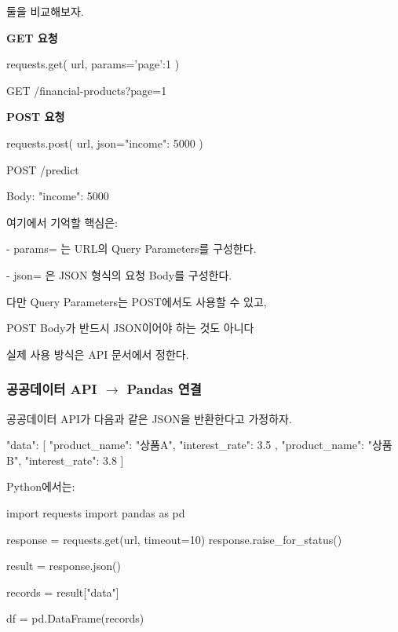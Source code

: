 둘을 비교해보자.

\textbf{GET 요청}

\begin{dhkcode}
requests.get(
    url,
    params={'page':1}
)

GET /financial-products?page=1
\end{dhkcode}

\textbf{POST 요청}

\begin{dhkcode}
requests.post(
    url,
    json={"income": 5000}
)

POST /predict

Body:
{"income": 5000}
\end{dhkcode}

여기에서 기억할 핵심은:

\begin{dhksmry}
    - params= 는 URL의 Query Parameters를 구성한다.

    - json= 은 JSON 형식의 요청 Body를 구성한다.
\end{dhksmry}

다만 Query Parameters는 POST에서도 사용할 수 있고,

POST Body가 반드시 JSON이어야 하는 것도 아니다

실제 사용 방식은 API 문서에서 정한다.

\subsubsection{공공데이터 API $\rightarrow$ Pandas 연결}

공공데이터 API가 다음과 같은 JSON을 반환한다고 가정하자.

\begin{dhkzsh}
{
    "data": [
        {
            "product_name": "상품A",
            "interest_rate": 3.5
        },
        {
            "product_name": "상품B",
            "interest_rate": 3.8
        }
    ]
}
\end{dhkzsh}

Python에서는:

\begin{dhkcode}
import requests
import pandas as pd

response = requests.get(url, timeout=10)
response.raise_for_status()

result = response.json()

records = result["data"]

df = pd.DataFrame(records)
\end{dhkcode}

